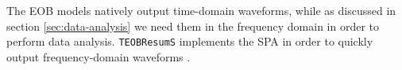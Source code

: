 \documentclass[main.tex]{subfiles}
\begin{document}

The \ac{EOB} models natively output time-domain waveforms, while as discussed in section \ref{sec:data-analysis} we need them in the frequency domain in order to perform data analysis. 
\texttt{TEOBResumS} implements the \ac{SPA} in order to quickly output frequency-domain waveforms \cite[]{gambaFastFaithfulFrequencydomain2020}.




\end{document}
